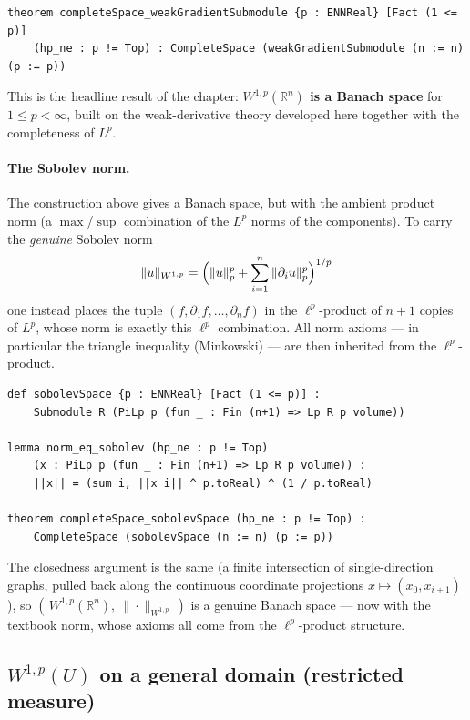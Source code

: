 ﻿\documentclass[12pt, a4paper]{article}
\renewcommand{\_}{\origunderscore\allowbreak}
\theoremstyle{definition}
\theoremstyle{plain}
\begin{document}
\begin{lstlisting}[caption={W^{1,p}(Rn) is a Banach space (proved)}]
theorem completeSpace_weakGradientSubmodule {p : ENNReal} [Fact (1 <= p)]
    (hp_ne : p != Top) : CompleteSpace (weakGradientSubmodule (n := n) (p := p))
\end{lstlisting}

This is the headline result of the chapter: \textbf{$W^{1,p}(\mathbb{R}^n)$ is a Banach
space} for $1\le p<\infty$, built on the weak-derivative theory developed here together with
the completeness of $L^p$.

\paragraph{The Sobolev norm.}
The construction above gives a Banach space, but with the ambient product norm (a
$\max$/$\sup$ combination of the $L^p$ norms of the components). To carry the \emph{genuine}
Sobolev norm
\[
  \|u\|_{W^{1,p}} = \Bigl(\|u\|_p^p + \sum_{i=1}^n \|\partial_i u\|_p^p\Bigr)^{1/p}
\]
one instead places the tuple $(f,\partial_1 f,\dots,\partial_n f)$ in the $\ell^p$-product of
$n+1$ copies of $L^p$, whose norm is exactly this $\ell^p$ combination. All norm axioms ---
in particular the triangle inequality (Minkowski) --- are then inherited from the
$\ell^p$-product.

\begin{lstlisting}[caption={W^{1,p}(Rn) with its Sobolev norm is a Banach space (proved)}]
def sobolevSpace {p : ENNReal} [Fact (1 <= p)] :
    Submodule R (PiLp p (fun _ : Fin (n+1) => Lp R p volume))

lemma norm_eq_sobolev (hp_ne : p != Top)
    (x : PiLp p (fun _ : Fin (n+1) => Lp R p volume)) :
    ||x|| = (sum i, ||x i|| ^ p.toReal) ^ (1 / p.toReal)

theorem completeSpace_sobolevSpace (hp_ne : p != Top) :
    CompleteSpace (sobolevSpace (n := n) (p := p))
\end{lstlisting}

The closedness argument is the same (a finite intersection of single-direction graphs,
pulled back along the continuous coordinate projections $x\mapsto(x_0,x_{i+1})$), so
$(\,W^{1,p}(\mathbb{R}^n),\ \|\cdot\|_{W^{1,p}}\,)$ is a genuine Banach space --- now with the
textbook norm, whose axioms all come from the $\ell^p$-product structure.

\subsection{$W^{1,p}(U)$ on a general domain (restricted measure)}
\end{document}
